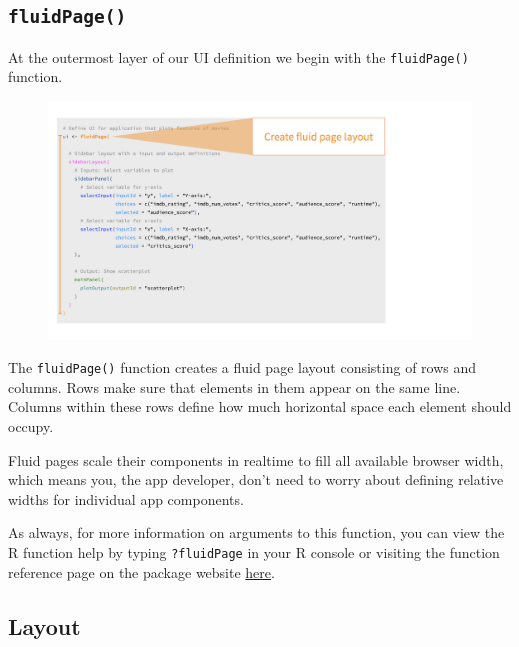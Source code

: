 \documentclass[
  letterpaper,
  DIV=11,
  numbers=noendperiod]{scrreprt}
\begin{document}
\hypertarget{fluidpage}{%
\subsection{\texorpdfstring{\texttt{fluidPage()}}{fluidPage()}}\label{fluidpage}}

At the outermost layer of our UI definition we begin with the
\texttt{fluidPage()} function.

\begin{figure}

{\centering \includegraphics[width=1\textwidth,height=\textheight]{./images/fluidPage.png}

}

\end{figure}

The \texttt{fluidPage()} function creates a fluid page layout consisting
of rows and columns. Rows make sure that elements in them appear on the
same line. Columns within these rows define how much horizontal space
each element should occupy.

Fluid pages scale their components in realtime to fill all available
browser width, which means you, the app developer, don't need to worry
about defining relative widths for individual app components.

As always, for more information on arguments to this function, you can
view the R function help by typing \texttt{?fluidPage} in your R console
or visiting the function reference page on the package website
\href{https://shiny.rstudio.com/reference/shiny/latest/}{here}.

\hypertarget{layout}{%
\subsection{Layout}\label{layout}}
\end{document}
